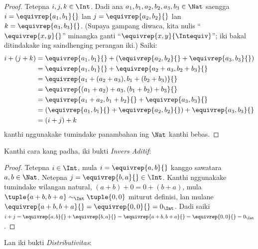 \documentclass[../../../include/open-logic-section]{subfiles}
\begin{document}
\begin{proof}
Tetepna $i, j, k \in \Int$. Dadi ana $a_1, b_1, a_2, b_2, a_3, b_3 \in
\Nat$ saengga $i = \equivrep{a_1, b_1}{}$ lan $j =
\equivrep{a_2,b_2}{}$ lan $k = \equivrep{a_3, b_3}{}$. (Supaya gampang
diwaca, kita nulis ``$\equivrep{x, y}{}$'' minangka ganti
``$\equivrep{x, y}{\Intequiv}$''; iki bakal ditindakake ing saindhenging
perangan iki.) Saiki:
\begin{align*}
	i + (j + k) &= \equivrep{a_1, b_1}{}+(\equivrep{a_2, b_2}{} + \equivrep{a_3, b_3}{}) \\
	&= \equivrep{a_1,  b_1}{} + \equivrep{a_2+a_3, b_2+b_3}{}\\
	&= \equivrep{a_1 + (a_2 + a_3), b_1 + (b_2 + b_3)}{}\\
	&= \equivrep{(a_1 + a_2) + a_3, (b_1 + b_2) + b_3}{}\\
	&= \equivrep{a_1 + a_2, b_1 + b_2}{} + \equivrep{a_3, b_3}{}\\
	&= (\equivrep{a_1, b_1}{} + \equivrep{a_2, b_2}{}) + \equivrep{a_3, b_3}{}\\
	&= (i+j) + k
\end{align*}
kanthi nggunakake tumindake panambahan ing $\Nat$ kanthi bebas.
\end{proof}

Kanthi cara kang padha, iki bukti \emph{Invers Aditif}:

\begin{proof}
Tetepna $i \in \Int$, mula $i = \equivrep{a,b}{}$ kanggo sawatara $a,b \in
\Nat$. Netepna $j = \equivrep{b,a}{} \in \Int$. Kanthi nggunakake tumindake
wilangan natural, $(a+b) + 0 = 0 + (b+a)$, mula $\tuple{a+b, b+a}
\sim_\Int \tuple{0,0}$ miturut definisi, lan mulane
$\equivrep{a+b, b+a}{} = \equivrep{0, 0}{} = 0_\Int$. Dadi saiki $i + j =
\equivrep{a,b}{}+\equivrep{b,a}{}=\equivrep{a+b, b+a}{}= \equivrep{0,
0}{} = 0_\Int$.
\end{proof}

Lan iki bukti \emph{Distributivitas}:
\end{document}
